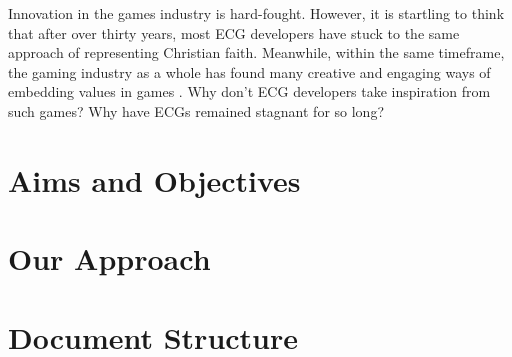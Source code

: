 Innovation in the games industry is hard-fought. However, it is startling to think that after over thirty years, most \ac{ECG} developers have stuck to the same approach of representing Christian faith. Meanwhile, within the same timeframe, the gaming industry as a whole has found many creative and engaging ways of embedding values in games \parencite{bogost_persuasive_2007, flanagan_values_2014}. Why don't \ac{ECG} developers take inspiration from such games? Why have \acp{ECG} remained stagnant for so long?

\section{Aims and Objectives} 
\blindtext

\section{Our Approach} 
\blindtext

\section{Document Structure}
\blindtext
